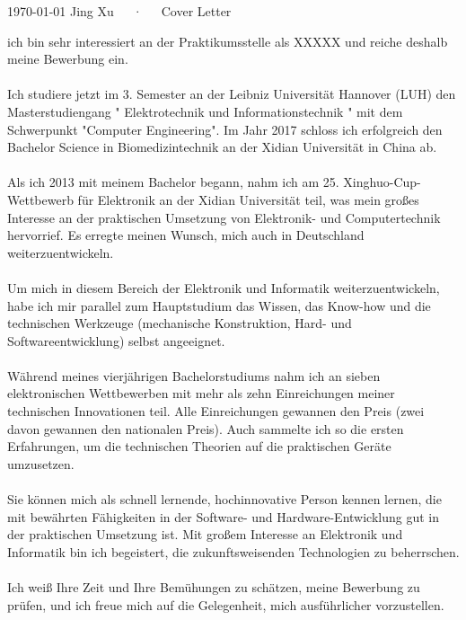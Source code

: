 \documentclass[11pt, a4paper]{awesome-cv}
\begin{document}
\makecvheader[R]

\makecvfooter
  {\today}
  {Jing Xu~~~·~~~Cover Letter}
  {}

\makelettertitle

\begin{cvletter}


ich bin sehr interessiert an der Praktikumsstelle als XXXXX und reiche deshalb meine Bewerbung ein.\\\\
Ich studiere jetzt im 3. Semester an der Leibniz Universität Hannover (LUH) den Masterstudiengang " Elektrotechnik und Informationstechnik " mit dem Schwerpunkt "Computer Engineering". Im Jahr 2017 schloss ich erfolgreich den Bachelor Science in Biomedizintechnik an der Xidian Universität in China ab.\\\\
Als ich 2013 mit meinem Bachelor begann, nahm ich am 25. Xinghuo-Cup-Wettbewerb für Elektronik an der Xidian Universität teil, was mein großes Interesse an der praktischen Umsetzung von Elektronik- und Computertechnik hervorrief. Es erregte meinen Wunsch, mich auch in Deutschland weiterzuentwickeln.\\\\
Um mich in diesem Bereich der Elektronik und Informatik weiterzuentwickeln, habe ich mir parallel zum Hauptstudium das Wissen, das Know-how und die technischen Werkzeuge (mechanische Konstruktion, Hard- und Softwareentwicklung) selbst angeeignet.\\\\
Während meines vierjährigen Bachelorstudiums nahm ich an sieben elektronischen Wettbewerben mit mehr als zehn Einreichungen meiner technischen Innovationen teil. Alle Einreichungen gewannen den Preis (zwei davon gewannen den nationalen Preis). Auch sammelte ich so die ersten Erfahrungen, um die technischen Theorien auf die praktischen Geräte umzusetzen.\\\\
Sie können mich als schnell lernende, hochinnovative Person kennen lernen, die mit bewährten Fähigkeiten in der Software- und Hardware-Entwicklung gut in der praktischen Umsetzung ist. Mit großem Interesse an Elektronik und Informatik bin ich begeistert, die zukunftsweisenden Technologien zu beherrschen.\\\\
Ich weiß Ihre Zeit und Ihre Bemühungen zu schätzen, meine Bewerbung zu prüfen, und ich freue mich auf die Gelegenheit, mich ausführlicher vorzustellen.\\\\



\end{cvletter}


\makeletterclosing
\end{document}
